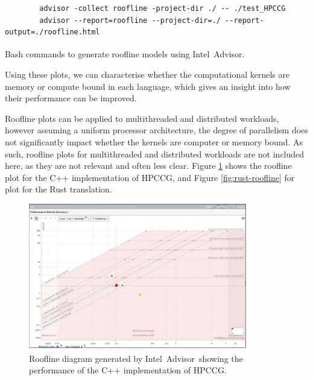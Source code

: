 \begin{code}
    \begin{verbatim}
        advisor -collect roofline -project-dir ./ -- ./test_HPCCG
        advisor --report=roofline --project-dir=./ --report-output=./roofline.html
    \end{verbatim}
    \caption{Bash commands to generate roofline models using Intel\textsuperscript{\textregistered}\ Advisor.}
    \label{listing:roofline-generation}
\end{code}

Using these plots, we can characterise whether the computational kernels are memory or compute bound in each language, which gives an insight into how their performance can be improved.

Roofline plots can be applied to multithreaded and distributed workloads, however assuming a uniform processor architecture, the degree of parallelism does not significantly impact whether the kernels are computer or memory bound. As such, roofline plots for multithreaded and distributed workloads are not included here, as they are not relevant and often less clear. Figure \ref{fig:cpp-roofline} shows the roofline plot for the C++ implementation of HPCCG, and Figure \ref{fig:rust-roofline} for plot for the Rust translation.

\begin{figure}[H]
    \centering
    \includegraphics[width=0.85\textwidth]{images/5_performance/rooflines/cpp_roofline.png}
    \caption{Roofline diagram generated by Intel\textsuperscript{\textregistered}\ Advisor\ showing the performance of the C++ implementation of HPCCG.}
    \label{fig:cpp-roofline}
\end{figure}

